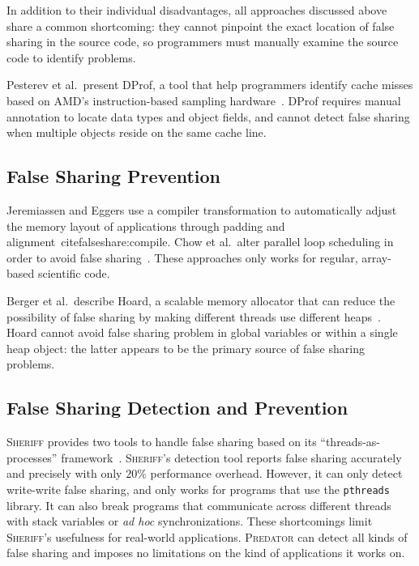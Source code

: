 \documentclass[10pt]{sigplanconf}
\newcommand{\Sheriff}{{\scshape Sheriff}}
\newcommand{\sheriff}{{\scshape Sheriff}}
\newcommand{\Predator}{{\scshape Predator}}
\newcommand{\pthreads}{\texttt{pthreads}}
\begin{document}
In addition to their individual disadvantages,
all approaches discussed above share a common shortcoming:  
they cannot pinpoint the exact location of false sharing in the source code, so programmers must manually examine the source code to identify problems.

Pesterev et al.\ present DProf, a tool that help programmers identify cache misses based on AMD's instruction-based sampling hardware~\cite{DProf}. DProf requires manual annotation to locate data types and object fields, and cannot detect false sharing when multiple objects reside on the same cache line.

\subsection{False Sharing Prevention}

Jeremiassen and Eggers use a compiler transformation to automatically adjust the memory layout of applications through padding and alignment~cite{falseshare:compile}. Chow et al.\ alter parallel loop scheduling in order to avoid false
sharing~\cite{falseshare:schedule}. These approaches only works for regular, array-based scientific code.

Berger et al.\ describe Hoard, a scalable memory allocator that can reduce the possibility of false sharing by making different threads use different heaps~\cite{Hoard}. Hoard cannot avoid false sharing problem in global variables or within a single heap object: the latter appears to be the primary source of false sharing problems.

\subsection{False Sharing Detection and Prevention}

\sheriff{} provides two tools to handle false sharing based on its ``threads-as-processes'' framework~\cite{sheriff}.
\Sheriff{}'s detection tool reports false sharing accurately and precisely with only $20\%$ performance overhead.
However, it can only detect write-write false sharing, and only works for programs that use the \pthreads{} library. It can also break programs that communicate across different threads with stack variables or \emph{ad hoc} synchronizations. These shortcomings limit \Sheriff{}'s usefulness for real-world applications.  
\Predator{} can detect all kinds of false sharing and imposes no limitations on the kind of applications it works on. 
\end{document}
